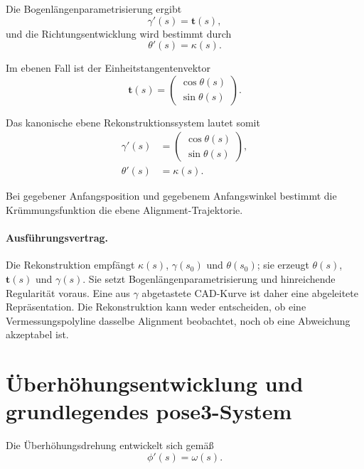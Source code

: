 Die Bogenlängenparametrisierung ergibt
\begin{equation}
\gamma'(s)=\mathbf t(s),
\label{eq:state-evolution}
\end{equation}
und die Richtungsentwicklung wird bestimmt durch
\begin{equation}
\theta'(s)=\kappa(s).
\label{eq:curvature-relation}
\end{equation}

Im ebenen Fall ist der Einheitstangentenvektor
\begin{equation}
\mathbf t(s)
=
\begin{pmatrix}
\cos\theta(s)\\
\sin\theta(s)
\end{pmatrix}.
\label{eq:planar-tangent}
\end{equation}

Das kanonische ebene Rekonstruktionssystem lautet somit
\begin{equation}
\begin{aligned}
\gamma'(s)
&=
\begin{pmatrix}
\cos\theta(s)\\
\sin\theta(s)
\end{pmatrix},\\
\theta'(s)&=\kappa(s).
\end{aligned}
\label{eq:pose2-system}
\end{equation}

Bei gegebener Anfangsposition und gegebenem Anfangswinkel bestimmt die
Krümmungsfunktion die ebene Alignment-Trajektorie.

\paragraph{Ausführungsvertrag.}
Die Rekonstruktion empfängt \(\kappa(s)\), \(\gamma(s_0)\) und
\(\theta(s_0)\); sie erzeugt \(\theta(s)\), \(\mathbf t(s)\) und
\(\gamma(s)\). Sie setzt Bogenlängenparametrisierung und hinreichende
Regularität voraus. Eine aus \(\gamma\) abgetastete CAD-Kurve ist daher eine
abgeleitete Repräsentation. Die Rekonstruktion kann weder entscheiden, ob eine
Vermessungspolyline dasselbe Alignment beobachtet, noch ob eine Abweichung
akzeptabel ist.

\section{Überhöhungsentwicklung und grundlegendes pose3-System}

Die Überhöhungsdrehung entwickelt sich gemäß
\begin{equation}
\phi'(s)=\omega(s).
\label{eq:cant-evolution}
\end{equation}

